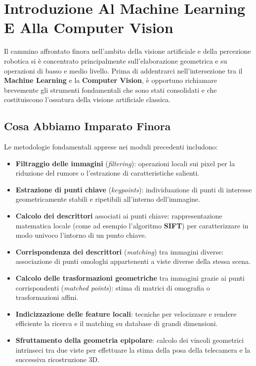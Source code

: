 ﻿\documentclass[11pt, a4paper]{article}
\author{Francesco Lo Verde}
\begin{document}
\section{Introduzione Al Machine Learning E Alla Computer Vision}

Il cammino affrontato finora nell'ambito della visione artificiale e della percezione robotica si è concentrato principalmente sull'elaborazione geometrica e su operazioni di basso e medio livello. Prima di addentrarci nell'intersezione tra il \textbf{Machine Learning} e la \textbf{Computer Vision}, è opportuno richiamare brevemente gli strumenti fondamentali che sono stati consolidati e che costituiscono l'ossatura della visione artificiale classica.

\subsection{Cosa Abbiamo Imparato Finora}

Le metodologie fondamentali apprese nei moduli precedenti includono:
\begin{itemize}
    \item \textbf{Filtraggio delle immagini} (\emph{filtering}): operazioni locali sui pixel per la riduzione del rumore o l'estrazione di caratteristiche salienti.
    \item \textbf{Estrazione di punti chiave} (\emph{keypoints}): individuazione di punti di interesse geometricamente stabili e ripetibili all'interno dell'immagine.
    \item \textbf{Calcolo dei descrittori} associati ai punti chiave: rappresentazione matematica locale (come ad esempio l'algoritmo \textbf{SIFT}) per caratterizzare in modo univoco l'intorno di un punto chiave.
    \item \textbf{Corrispondenza dei descrittori} (\emph{matching}) tra immagini diverse: associazione di punti omologhi appartenenti a viste diverse della stessa scena.
    \item \textbf{Calcolo delle trasformazioni geometriche} tra immagini grazie ai punti corrispondenti (\emph{matched points}): stima di matrici di omografia o trasformazioni affini.
    \item \textbf{Indicizzazione delle feature locali}: tecniche per velocizzare e rendere efficiente la ricerca e il matching su database di grandi dimensioni.
    \item \textbf{Sfruttamento della geometria epipolare}: calcolo dei vincoli geometrici intrinseci tra due viste per effettuare la stima della posa della telecamera e la successiva ricostruzione 3D.
\end{itemize}
\end{document}
